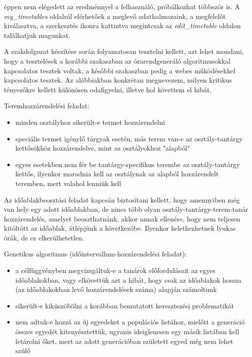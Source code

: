 éppen nem elégedett az eredménnyel a felhasználó, próbálkozhat többször is. A \textit{my\_timetables} oldalról elérhetőek a meglevő adathalmazaink, a megfelelőt kiválasztva, a szerkesztés ikonra kattintva megintcsak az \textit{edit\_timetable} oldalon találhatjuk magunkat.


A szakdolgozat készítése során folyamatosan tesztelni kellett, azt lehet mondani, hogy a tesztelések a korábbi szakaszban az órarendgeneráló algoritmusokkal kapcsolatos tesztek voltak, a későbbi szakaszban pedig a webes működésekkel kapcsolatos tesztek. Az alábbiakban konkrétan megnevezem, milyen kritikus tényezőkre kellett különösen odafigyelni, illetve hol követtem el hibát.

Teremhozzárendelési feladat:
\begin{itemize}
	\item minden osztályhoz sikerült-e termet hozzárendelni
	\item speciális termet igénylő tárgyak esetén, más terem van-e az osztály-tantárgy kettősökhöz hozzárendelve, mint az osztályokhoz "alapból"
	\item egyes esetekben nem fér be tantárgy-specifikus terembe az osztály-tantárgy kettős, ilyenkor maradnia kell az osztálynak az alapból hozzárendelt teremben, mert valahol lenniük kell
\end{itemize}

Az időablakbeosztási feladat kapcsán biztosítani kellett, hogy amennyiben még van hely egy adott időablakban, de nincs több olyan osztály-tantárgy-terem-tanár hozzárendelés, amelyet  beoszthatnánk, akkor annak ellenére, hogy nem teljesen kitöltött az időablak, átlépjünk a következőbe. Ilyenkor keletkezhetnek lyukas órák, de ez elkerülhetetlen.

Genetikus algoritmus (időintervallum-hozzárendelési feladat):
\begin{itemize}
	\item a célfüggvényben megvizsgáltuk-e a tanárok előfordulásait az egyes időablakokban, vagy elkövettük azt a hibát, hogy csak az időablakok hossza (az időablakokban levő hozzárendelések száma) alapján számoltunk
	\item sikerült-e kiküszöbölni a korábban bemutatott keresztezési problematikát
	\item nem adtuk-e hozzá az új egyedeket a populációs listához, mielőtt a generáció összes egyedét kitenyésztettük, ugyanis ideiglenesen egy másik listában kell letárolni őket, mert az adott generációban született egyed még nem lehet szülő
\end{itemize}

